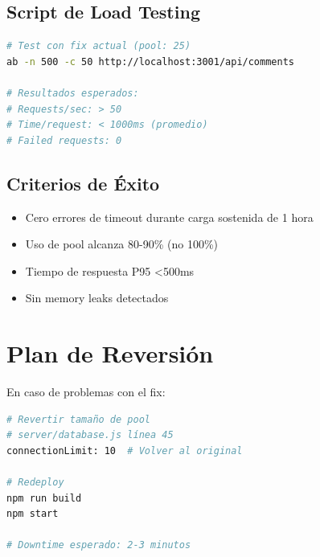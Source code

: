 \documentclass[12pt,a4paper]{article}
\begin{document}
\subsection{Script de Load Testing}

\begin{lstlisting}[language=bash, caption=Load test con fix aplicado]
# Test con fix actual (pool: 25)
ab -n 500 -c 50 http://localhost:3001/api/comments

# Resultados esperados:
# Requests/sec: > 50
# Time/request: < 1000ms (promedio)
# Failed requests: 0
\end{lstlisting}

\subsection{Criterios de Éxito}

\begin{itemize}
    \item[$\square$] Cero errores de timeout durante carga sostenida de 1 hora
    \item[$\square$] Uso de pool alcanza 80-90\% (no 100\%)
    \item[$\square$] Tiempo de respuesta P95 \textless 500ms
    \item[$\square$] Sin memory leaks detectados
\end{itemize}

\newpage

\section{Plan de Reversión}

En caso de problemas con el fix:

\begin{lstlisting}[language=bash, caption=Revertir cambios]
# Revertir tamaño de pool
# server/database.js línea 45
connectionLimit: 10  # Volver al original

# Redeploy
npm run build
npm start

# Downtime esperado: 2-3 minutos
\end{lstlisting}

\newpage

\end{document}
